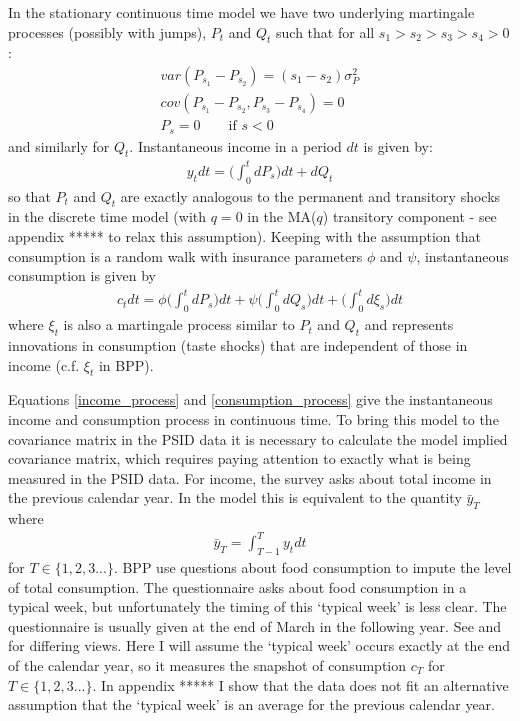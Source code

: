 \documentclass[titlepage]{\econtex}\newcommand{\texname}{BPP_PSID_TimeAgg}
\begin{document}
In the stationary continuous time model we have two underlying martingale processes (possibly with jumps), $P_t$ and $Q_t$ such that for all $s_1>s_2>s_3>s_4>0$:
\begin{align*}
var(P_{s_1}-P_{s_2})=(s_1-s_2)\sigma_P^2 \\
cov(P_{s_1}-P_{s_2},P_{s_3}-P_{s_4}) = 0 \\
P_s = 0 \qquad \text{if } s<0
\end{align*}
and similarly for $Q_t$. Instantaneous income in a period $dt$ is given by:
\begin{align}
y_t dt = \Big( \int_{0}^{t}dP_s \Big) dt  +dQ_t \label{income_process}
\end{align}
so that $P_t$ and $Q_t$ are exactly analogous to the permanent and transitory shocks in the discrete time model (with $q=0$ in the MA($q$) transitory component - see appendix ***** to relax this assumption). Keeping with the assumption that consumption is a random walk with insurance parameters $\phi$ and $\psi$, instantaneous consumption is given by
\begin{align}
c_t dt = \phi \Big( \int_{0}^{t} dP_s  \Big) dt +\psi\Big( \int_{0}^{t}dQ_s\Big) dt +\Big( \int_{0}^{t}d\xi_s\Big) dt \label{consumption_process}
\end{align}
where $\xi_t$ is also a martingale process similar to $P_t$ and $Q_t$ and represents innovations in consumption (taste shocks) that are independent of those in income (c.f. $\xi_{t}$ in BPP).

Equations \ref{income_process} and \ref{consumption_process} give the instantaneous income and consumption process in continuous time. To bring this model to the covariance matrix in the PSID data it is necessary to calculate the model implied covariance matrix, which requires paying attention to exactly what is being measured in the PSID data. For income, the survey asks about total income in the previous calendar year. In the model this is equivalent to the quantity $\bar{y}_T$ where
\begin{align*}
\bar{y}_T = \int_{T-1}^{T} y_t dt
\end{align*}
for $T \in \{1,2,3...\}$. BPP use questions about food consumption to impute the level of total consumption. The questionnaire asks about food consumption in a typical week, but unfortunately the timing of this `typical week' is less clear. The questionnaire is usually given at the end of March in the following year. See \cite{altonji_testing_1987} and \cite{hall_sensitivity_1982} for differing views. Here I will assume the `typical week' occurs exactly at the end of the calendar year, so it measures the snapshot of consumption $c_T$ for $T \in \{1,2,3...\}$. In appendix ***** I show that the data does not fit an alternative assumption that the `typical week' is an average for the previous calendar year.
\end{document}
